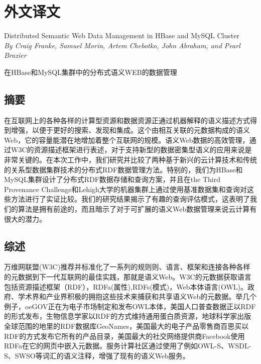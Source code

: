 \pagestyle{empty}

\chapter*{外\quad 文\quad 译\quad 文}

\begin{center}
{\heiti{}Distributed Semantic Web Data Management in HBase and MySQL Cluster \\
\textsl{By Craig Franke, Samuel Morin, Artem Chebotko, John Abraham, and Pearl Brazier}

\heiti 在HBase和MySQL集群中的分布式语义WEB的数据管理
}
\end{center}


\section*{摘要}
在互联网上的各种各样的计算型资源和数据资源正通过机器解释的语义描述方式得到增强，以便于更好的搜索、发现和集成。这个由相互关联的元数据构成的语义Web，它的容量能潜在地增加着整个互联网的规模。语义Web数据的高效管理，通过W3C的资源描述框架进行表述，对于支持新型的数据密集型语义的应用来说是非常关键的。在本次工作中，我们研究并比较了两种基于新兴的云计算技术和传统的关系型数据集群技术的分布式RDF数据管理方法。特别的，我们为HBase和MySQL集群设计了分布式RDF数据存储和查询方案，并且在the Third Provenance Challenge和Lehigh大学的机器集群上通过使用基准数据集和查询对这些方法进行了实证比较。我们的研究结果揭示了有趣的查询评估模式，这表明了我们的算法是拥有前途的，而且暗示了对于可扩展的语义Web数据管理来说云计算有很大的潜力。


\section*{综述}
  万维网联盟(W3C)推荐并标准化了一系列的规则则、语言、框架和连接各种各样的元数据到下一代互联网的最佳实践，那就是语义Web。W3C的元数据获取语言包括资源描述框架（RDF），RDFa(属性),RDFs(模式)，Web本体语言(OWL)。政府、学术界和产业界积极的拥抱这些技术来捕获和共享语义Web的元数据。举几个例子，oeGOV正在为电子市场制定和发布OWL本体，美国人口普查数据正以RDF的形式发布，生物信息学家以RDF的方式维持通用蛋白质资源，地球科学家出版全球范围的地里的RDF数据库GeoNames，美国最大的电子产品零售商百思买以RDF的方式发布它所有的产品目录，美国最大的社交网络提供商Facebook使用RDFa在它的网页中嵌入元数据。服务计算社区通过使用了例如OWL-S、WSDL-S、SWSO等词汇的语义注释，增强了现有的语义Web服务。


